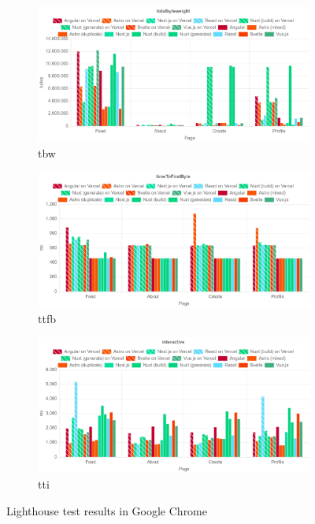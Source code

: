 \documentclass[a4paper, 12pt]{article}
\begin{document}
\begin{figure}[ht!]
  \centering
  \begin{subfigure}{0.8\linewidth}
    \begin{center}
      \includegraphics[width=\linewidth, keepaspectratio]{img/lighthouse-results/TBW.png}
    \end{center}
    \caption{\acrfull{tbw}}\label{subfig:LH:totalbyteweight}
  \end{subfigure}
  \begin{subfigure}{0.8\linewidth}
    \begin{center}
      \includegraphics[width=\linewidth, keepaspectratio]{img/lighthouse-results/TTFB.png}
    \end{center}
    \caption{\acrfull{ttfb}}\label{subfig:LH:timeToFirstByte}
  \end{subfigure}
  \begin{subfigure}{0.8\linewidth}
    \begin{center}
      \includegraphics[width=\linewidth, keepaspectratio]{img/lighthouse-results/TTI.png}
    \end{center}
    \caption{\acrfull{tti}}\label{subfig:LH:interactive}
  \end{subfigure}
  \caption{Lighthouse test results in Google Chrome}
\end{figure}
\end{document}
